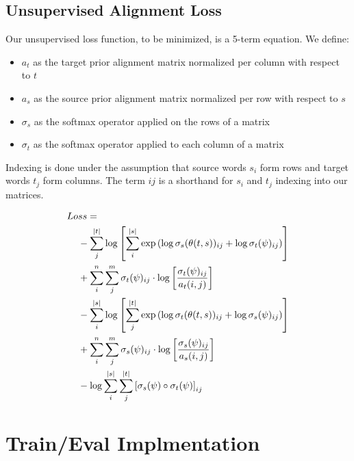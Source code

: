 \documentclass[twoside,twocolumn]{article}
\begin{document}
\subsection{Unsupervised Alignment Loss}


Our unsupervised loss function, to be minimized, is a 5-term equation. We define:
\begin{itemize}[label={}]
  \item $a_t$ as the target prior alignment matrix normalized per column with respect to $t$\\ %
  \item $a_s$ as the source prior alignment matrix normalized per row with respect to $s$\\ %
  \item $\sigma_s$ as the softmax operator applied on the rows of a matrix\\
  \item $\sigma_t$ as the softmax operator applied to each column of a matrix
\end{itemize}

Indexing is done under the assumption that source words $s_i$ form rows
and target words $t_j$ form columns. The term $ij$ is a shorthand
for $s_i$ and $t_j$ indexing into our matrices.

\begin{equation}
  \centering
\begin{split}
  Lo&ss = \\
  &- \sum_j^{|t|} \log \left[
      \sum_i^{|s|} \exp \left(
        \log \sigma_s(\theta(t, s))_{ij} + \log \sigma_t(\psi)_{ij} \right)
    \right] \\
  &+ \sum_i^n \sum_j^m \sigma_t(\psi)_{ij} \cdot \log \left[
    \frac{\sigma_t(\psi)_{ij}}{a_t(i, j)} \right] \\
  &- \sum_i^{|s|} \log \left[ \sum_j^{|t|}
      \exp \left(
        \log \sigma_t(\theta(t, s))_{ij} + \log \sigma_s(\psi)_{ij}
      \right)
    \right] \\
  &+ \sum_i^n \sum_j^m \sigma_s(\psi)_{ij} \cdot \log \left[
    \frac{\sigma_s(\psi)_{ij}}{a_s(i, j)} \right] \\
  &- \log \sum_i^{|s|} \sum_j^{|t|} \left[
    \sigma_s(\psi) \circ \sigma_t(\psi) \right]_{ij} \\
\end{split}
\end{equation}


\section{Train/Eval Implmentation}
\end{document}
